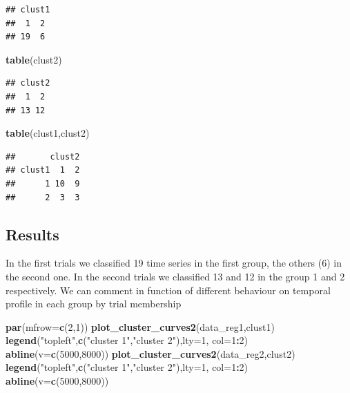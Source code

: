 \documentclass[]{article}
\newenvironment{Shaded}{\begin{snugshade}}{\end{snugshade}}
\newcommand{\DataTypeTok}[1]{\textcolor[rgb]{0.13,0.29,0.53}{#1}}
\newcommand{\DecValTok}[1]{\textcolor[rgb]{0.00,0.00,0.81}{#1}}
\newcommand{\KeywordTok}[1]{\textcolor[rgb]{0.13,0.29,0.53}{\textbf{#1}}}
\newcommand{\NormalTok}[1]{#1}
\newcommand{\OperatorTok}[1]{\textcolor[rgb]{0.81,0.36,0.00}{\textbf{#1}}}
\newcommand{\StringTok}[1]{\textcolor[rgb]{0.31,0.60,0.02}{#1}}
\begin{document}
\begin{verbatim}
## clust1
##  1  2 
## 19  6
\end{verbatim}

\begin{Shaded}
\begin{Highlighting}[]
\KeywordTok{table}\NormalTok{(clust2)}
\end{Highlighting}
\end{Shaded}

\begin{verbatim}
## clust2
##  1  2 
## 13 12
\end{verbatim}

\begin{Shaded}
\begin{Highlighting}[]
\KeywordTok{table}\NormalTok{(clust1,clust2)}
\end{Highlighting}
\end{Shaded}

\begin{verbatim}
##       clust2
## clust1  1  2
##      1 10  9
##      2  3  3
\end{verbatim}

\subsection{Results}

In the first trials we classified 19 time series in the first group, the
others (6) in the second one. In the second trials we classified 13 and
12 in the group 1 and 2 respectively. We can comment in function of
different behaviour on temporal profile in each group by trial
membership

\begin{Shaded}
\begin{Highlighting}[]
\KeywordTok{par}\NormalTok{(}\DataTypeTok{mfrow=}\KeywordTok{c}\NormalTok{(}\DecValTok{2}\NormalTok{,}\DecValTok{1}\NormalTok{))}
\KeywordTok{plot_cluster_curves2}\NormalTok{(data_reg1,clust1)}
\KeywordTok{legend}\NormalTok{(}\StringTok{"topleft"}\NormalTok{,}\KeywordTok{c}\NormalTok{(}\StringTok{"cluster 1"}\NormalTok{,}\StringTok{"cluster 2"}\NormalTok{),}\DataTypeTok{lty=}\DecValTok{1}\NormalTok{, }\DataTypeTok{col=}\DecValTok{1}\OperatorTok{:}\DecValTok{2}\NormalTok{)}
\KeywordTok{abline}\NormalTok{(}\DataTypeTok{v=}\KeywordTok{c}\NormalTok{(}\DecValTok{5000}\NormalTok{,}\DecValTok{8000}\NormalTok{))}
\KeywordTok{plot_cluster_curves2}\NormalTok{(data_reg2,clust2)}
\KeywordTok{legend}\NormalTok{(}\StringTok{"topleft"}\NormalTok{,}\KeywordTok{c}\NormalTok{(}\StringTok{"cluster 1"}\NormalTok{,}\StringTok{"cluster 2"}\NormalTok{),}\DataTypeTok{lty=}\DecValTok{1}\NormalTok{, }\DataTypeTok{col=}\DecValTok{1}\OperatorTok{:}\DecValTok{2}\NormalTok{)}
\KeywordTok{abline}\NormalTok{(}\DataTypeTok{v=}\KeywordTok{c}\NormalTok{(}\DecValTok{5000}\NormalTok{,}\DecValTok{8000}\NormalTok{))}
\end{Highlighting}
\end{Shaded}
\end{document}
